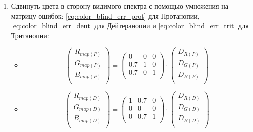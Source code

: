 \documentclass[a4paper,14pt, unknownkeysallowed]{extreport}
\begin{document}
\begin{enumerate}
        \item Сдвинуть цвета в сторону видимого спектра с помощью умножения на матрицу ошибок: \ref{eq:color_blind_err_prot} для Протанопии, \ref{eq:color_blind_err_deut} для Дейтеранопии и \ref{eq:color_blind_err_trit} для Тританопии:
        \begin{itemize}
            \item 
            \begin{equation}
                \label{eq:color_blind_err_prot}
                \begin{pmatrix}
                    R_{map(P)} \\
                    G_{map(P)} \\
                    B_{map(P)} \\
                \end{pmatrix} = 
                \begin{pmatrix}
                    0 & 0 & 0   \\
                    0.7 & 1 & 0 \\
                    0.7 & 0 & 1 \\
                \end{pmatrix} \cdot
                \begin{pmatrix}
                    D_{R(P)} \\
                    D_{G(P)} \\
                    D_{B(P)} \\
                \end{pmatrix}
            \end{equation}

            \item 
            \begin{equation}
                \label{eq:color_blind_err_deut}
                \begin{pmatrix}
                    R_{map(D)} \\
                    G_{map(D)} \\
                    B_{map(D)} \\
                \end{pmatrix} = 
                \begin{pmatrix}
                    1 & 0.7 & 0 \\
                    0 & 0 & 0   \\
                    0 & 0.7 & 1 \\
                \end{pmatrix} \cdot
                \begin{pmatrix}
                    D_{R(D)} \\
                    D_{G(D)} \\
                    D_{B(D)} \\
                \end{pmatrix}
            \end{equation}


\end{itemize}
\end{enumerate}
\end{document}
